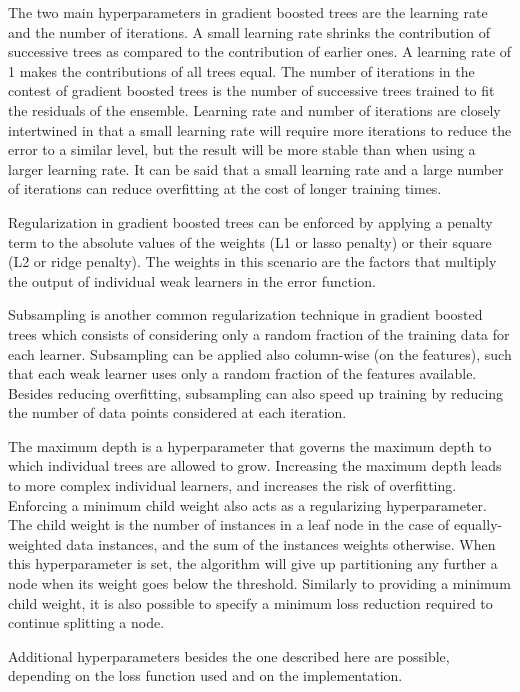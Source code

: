 The two main hyperparameters in gradient boosted trees are the learning rate and the number of iterations.
A small learning rate shrinks the contribution of successive trees as compared to the contribution of earlier ones.
A learning rate of \num{1} makes the contributions of all trees equal.
The number of iterations in the contest of gradient boosted trees is the number of successive trees trained to fit the residuals of the ensemble.
Learning rate and number of iterations are closely intertwined in that a small learning rate will require more iterations to reduce the error to a similar level, but the result will be more stable than when using a larger learning rate.
It can be said that a small learning rate and a large number of iterations can reduce overfitting at the cost of longer training times.

Regularization in gradient boosted trees can be enforced by applying a penalty term to the absolute values of the weights (L1 or lasso penalty) or their square (L2 or ridge penalty).
The weights in this scenario are the factors that multiply the output of individual weak learners in the error function.

Subsampling is another common regularization technique in gradient boosted trees which consists of considering only a random fraction of the training data for each learner.
Subsampling can be applied also column-wise (on the features), such that each weak learner uses only a random fraction of the features available.
Besides reducing overfitting, subsampling can also speed up training by reducing the number of data points considered at each iteration.

The maximum depth is a hyperparameter that governs the maximum depth to which individual trees are allowed to grow.
Increasing the maximum depth leads to more complex individual learners, and increases the risk of overfitting.
Enforcing a minimum child weight also acts as a regularizing hyperparameter.
The child weight is the number of instances in a leaf node in the case of equally-weighted data instances, and the sum of the instances weights otherwise.
When this hyperparameter is set, the algorithm will give up partitioning any further a node when its weight goes below the threshold.
Similarly to providing a minimum child weight, it is also possible to specify a minimum loss reduction required to continue splitting a node.

Additional hyperparameters besides the one described here are possible, depending on the loss function used and on the implementation.
